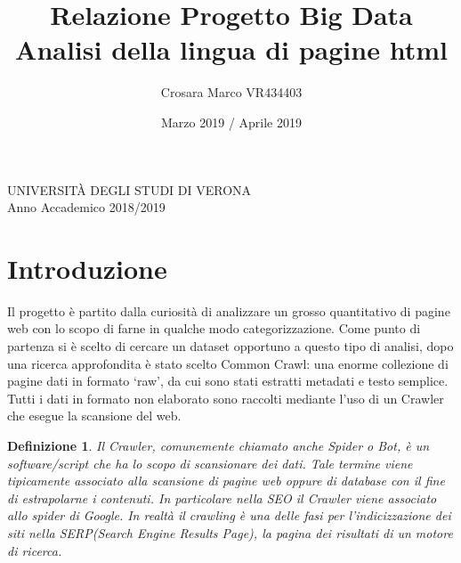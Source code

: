 \documentclass{article}
\title{Relazione Progetto Big Data\\Analisi della lingua di pagine html}
\author{Crosara Marco VR434403}
\date{Marzo 2019 / Aprile 2019}
\newtheorem*{definition}{Definizione}
\begin{document}
\maketitle
\thispagestyle{empty}

\vspace{\fill}

\begin{center}
  UNIVERSITÀ DEGLI STUDI DI VERONA\\
Anno Accademico 2018/2019
\end{center}

\newpage

\tableofcontents
\thispagestyle{empty}

\newpage



\section{Introduzione}

Il progetto è partito dalla curiosità di analizzare un grosso quantitativo di pagine web con lo scopo di farne in qualche modo categorizzazione. Come punto di partenza si è scelto di cercare un dataset opportuno a questo tipo di analisi, dopo una ricerca approfondita è stato scelto Common Crawl\cite{commoncrawl}: una enorme collezione di pagine dati in formato `raw', da cui sono stati estratti metadati e testo semplice. Tutti i dati in formato non elaborato sono raccolti mediante l'uso di un Crawler che esegue la scansione del web.

\begin{definition}
Il Crawler, comunemente chiamato anche Spider o Bot, è un software/script che ha lo scopo di scansionare dei dati. Tale termine viene tipicamente associato alla scansione di pagine web oppure di database con il fine di estrapolarne i contenuti. In particolare nella SEO il Crawler viene associato allo spider di Google. In realtà il crawling è una delle fasi per l’indicizzazione dei siti nella SERP(Search Engine Results Page), la pagina dei risultati di un motore di ricerca.
\end{definition}
\end{document}
